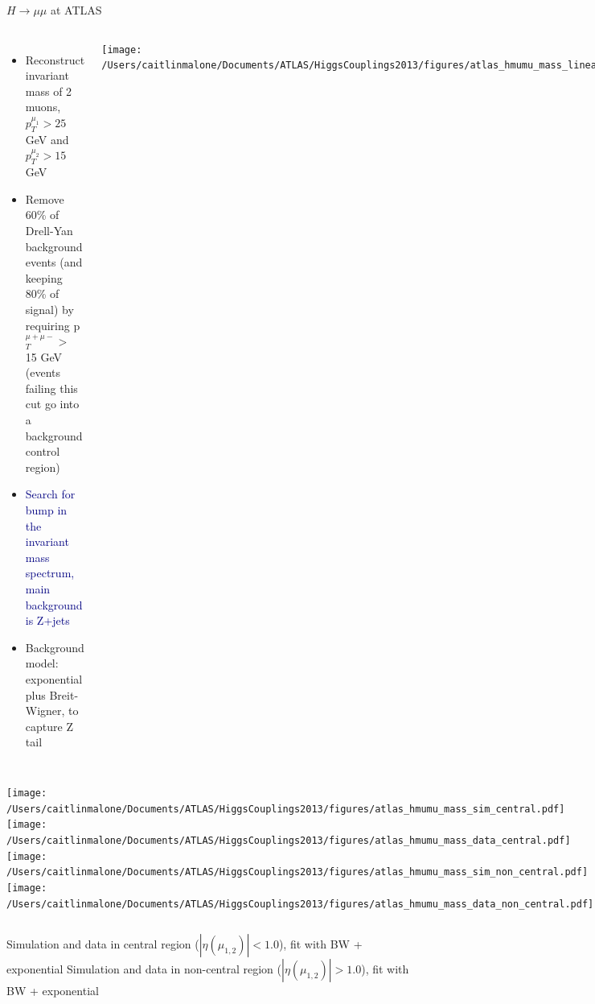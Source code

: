 \documentclass{beamer}
\begin{document}
\begin{frame}{$H\rightarrow\mu \mu$ at ATLAS}
	\begin{columns}[c]
	\column{2.5in}
		\begin{itemize}  \scriptsize
			\item \textcolor{BrickRed}{Reconstruct invariant mass of 2 muons, $p_{T}^{\mu_1}>25$ GeV and $p_{T}^{\mu_2}>15$ GeV}
			\item Remove 60\% of Drell-Yan background events (and keeping 80\% of signal) by requiring p$_T^{\mu+\mu-}>$ 15 GeV (events failing this cut go into a background control region)
			\item \textcolor{Navy}{Search for bump in the invariant mass spectrum, main background is Z+jets}
			\item Background model: exponential plus Breit-Wigner, to capture Z tail
		\end{itemize}
	\column{2.5in}
			\texttt{[image: /Users/caitlinmalone/Documents/ATLAS/HiggsCouplings2013/figures/atlas\_hmumu\_mass\_linear.pdf]} \\
			
	\end{columns}
	\begin{columns}[c]
			\texttt{[image: /Users/caitlinmalone/Documents/ATLAS/HiggsCouplings2013/figures/atlas\_hmumu\_mass\_sim\_central.pdf]}
			\texttt{[image: /Users/caitlinmalone/Documents/ATLAS/HiggsCouplings2013/figures/atlas\_hmumu\_mass\_data\_central.pdf]}
			\texttt{[image: /Users/caitlinmalone/Documents/ATLAS/HiggsCouplings2013/figures/atlas\_hmumu\_mass\_sim\_non\_central.pdf]}
			\texttt{[image: /Users/caitlinmalone/Documents/ATLAS/HiggsCouplings2013/figures/atlas\_hmumu\_mass\_data\_non\_central.pdf]}
	\end{columns}
	\begin{columns}[c]
		\tiny{\textcolor{BrickRed}{Simulation and data in central region ($|\eta(\mu_{1,2})|<1.0$), fit with BW + exponential}}
		\tiny{\textcolor{BrickRed}{Simulation and data in non-central region ($|\eta(\mu_{1,2})|>1.0$), fit with BW + exponential}}
	\end{columns}
	
\end{frame}
\end{document}
